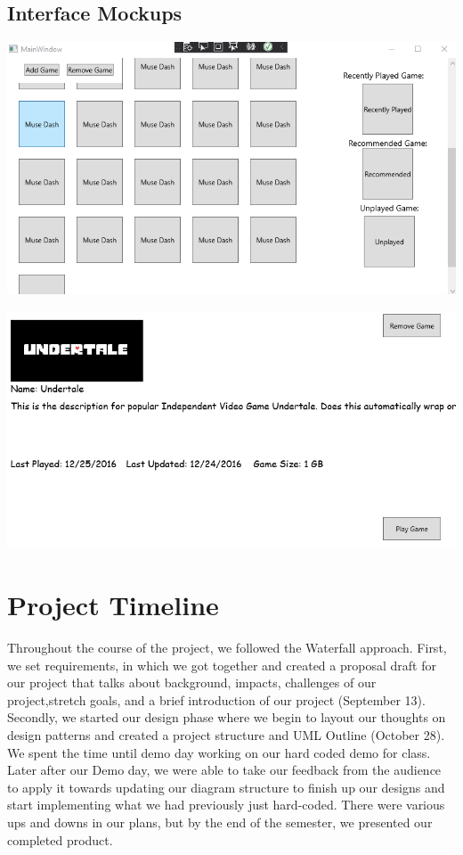 \documentclass[10pt,conference,onecolumn,compsoc]{IEEEtran}
\begin{document}
\subsection{Interface Mockups}
\includegraphics[width=6in]{mainwindow_final.png}

\includegraphics[width=6in]{gamewindow.png}
\section{Project Timeline}
Throughout the course of the project, we followed the Waterfall approach. First, we set requirements, in which we got together and created a proposal draft for our project that talks about background, impacts, challenges of our project,stretch goals, and a brief introduction of our project (September 13). Secondly, we started our design phase where we begin to layout our thoughts on design patterns and created a project structure and UML Outline (October 28). We spent the time until demo day working on our hard coded demo for class. Later after our Demo day, we were able to take our feedback from the audience to apply it towards updating our diagram structure to finish up our designs and start implementing what we had previously just hard-coded. There were various ups and downs in our plans, but by the end of the semester, we presented our completed product.
\end{document}
